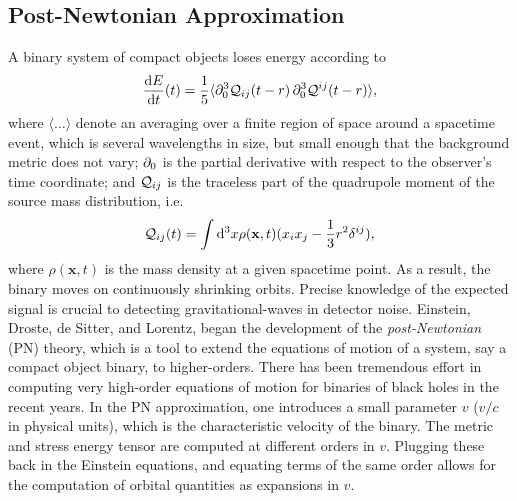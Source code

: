 \subsection{Post-{N}ewtonian Approximation}
\label{sec:PNWaveforms}

A binary system of compact objects loses energy according to 
%
\begin{equation}
\label{eq:energy_loss}
\frac{\D E}{\D t}(t) = \frac{1}{5}\langle \pd_0^3\Quad_{ij}(t-r)\,\pd_0^3\Quad^{ij}(t-r)\rangle,
\end{equation}
%
where $\langle\dots\rangle$ denote an averaging over a finite region
of space around a spacetime event, which is several wavelengths in size,
but small enough that the background metric does not vary;
% 
$\partial_0$ is the partial derivative with respect to the observer's
time coordinate; and $\mathcal{Q}_{ij}$ is the traceless part of the quadrupole 
moment of the source mass distribution, i.e.
%
\begin{equation}
\mathcal{Q}_{ij}(t) = \int \mathrm{d}^3 x \rho(\mathbf{x},t)(x_i x_j - \frac{1}{3}r^2 \delta^{ij}),
\end{equation}
% 
where $\rho(\mathbf{x},t)$ is the mass density at a given spacetime point.
As a result, the binary moves on continuously shrinking orbits.
Precise knowledge of the expected signal is crucial to detecting gravitational-waves
in detector noise. Einstein, Droste, de Sitter, and Lorentz,
began the development of the {\it post-Newtonian} (PN) theory, which is a
tool to extend the equations of motion of a system, say a compact object 
binary, to higher-orders. There has been tremendous effort in computing 
very high-order equations of motion for binaries of black holes in the
recent years. In the PN approximation, one introduces a small parameter 
$v$ ($v/c$ in physical units), which is the characteristic velocity of the binary.
The metric and
stress energy tensor are computed at different orders in 
$v$. Plugging these back in the Einstein equations, and equating terms of 
the same order allows for the computation of orbital quantities
as expansions in $v$. 


